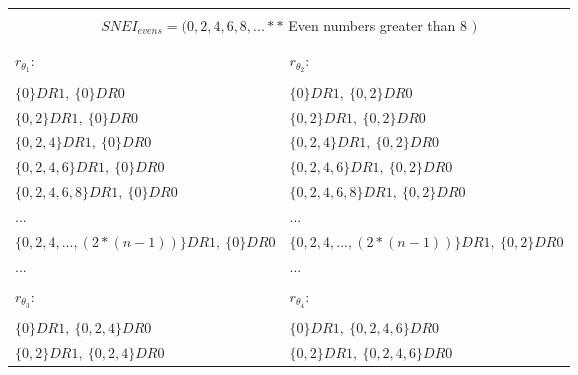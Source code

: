 	\begin{table}[h!]
		\begin{center}
			\begin{tabular}{|l||l|}
				\hline
				\multicolumn{2}{|c|}{\cellcolor{airforceblue}  } \\
				\multicolumn{2}{|c|}{\cellcolor{airforceblue} {\huge $SNEI_{evens} = (0, 2, 4, 6 , 8, ...**$} Even numbers greater than 8 {\huge $)$}    }\\
				\multicolumn{2}{|c|}{\cellcolor{airforceblue}  } \\
				\hline
				\hline
				\cellcolor{airforceblue!50} & \cellcolor{airforceblue!50}  \\
				\cellcolor{airforceblue!50} {\LARGE $r_{\theta_{1}}$:  } & \cellcolor{airforceblue!50} {\LARGE $r_{\theta_{2}}$:  } \\
				\cellcolor{airforceblue!50} & \cellcolor{airforceblue!50}  \\
				\hline
				\hline
				$\{0\}DR1,\:\{0\}DR0$ &
				$\{0\}DR1,\:\{0, 2\}DR0$ \\
				$\{0, 2\}DR1,\:\{0\}DR0$ &
				$\{0, 2\}DR1,\:\{0, 2\}DR0$ \\
				$\{0, 2, 4\}DR1,\:\{0\}DR0$ &
				$\{0, 2, 4\}DR1,\:\{0, 2\}DR0$ \\
				$\{0, 2, 4, 6\}DR1,\:\{0\}DR0$ &
				$\{0, 2, 4, 6\}DR1,\:\{0, 2\}DR0$ \\
				$\{0, 2, 4, 6, 8\}DR1,\:\{0\}DR0$ &
				$\{0, 2, 4, 6, 8\}DR1,\:\{0, 2\}DR0$ \\
				... & ... \\
				$\{0, 2, 4, ... , (2*(n-1))\}DR1,\:\{0\}DR0$ &
				$\{0, 2, 4, ... , (2*(n-1))\}DR1,\:\{0, 2\}DR0$ \\				
				... & ... \\						
				\hline
				\hline
				\cellcolor{airforceblue!50} & \cellcolor{airforceblue!50}  \\
				\cellcolor{airforceblue!50} {\LARGE $r_{\theta_{3}}$:  } & \cellcolor{airforceblue!50} {\LARGE $r_{\theta_{4}}$:  } \\
				\cellcolor{airforceblue!50} & \cellcolor{airforceblue!50}  \\
				\hline
				\hline
				$\{0\}DR1,\:\{0, 2, 4\}DR0$ &
				$\{0\}DR1,\:\{0, 2, 4, 6\}DR0$ \\
				$\{0, 2\}DR1,\:\{0, 2, 4\}DR0$ &
				$\{0, 2\}DR1,\:\{0, 2, 4, 6\}DR0$ \\

\end{tabular}
\end{center}
\end{table}
